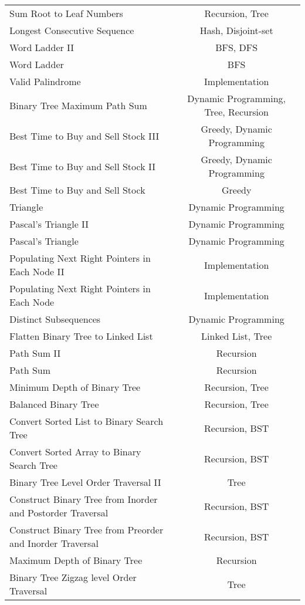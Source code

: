 \documentclass[paper=a4, fontsize=11pt]{scrartcl} %
\begin{document}
\begin{center}
\begin{longtable}{|l|c|}
    Sum Root to Leaf Numbers    &   Recursion, Tree   \\
    Longest Consecutive Sequence    &   Hash, Disjoint-set    \\
    Word Ladder II  &   BFS, DFS    \\
    Word Ladder &   BFS \\
    Valid Palindrome    &   Implementation  \\
    Binary Tree Maximum Path Sum    &   Dynamic Programming, Tree, Recursion \\
    Best Time to Buy and Sell Stock III &   Greedy, Dynamic Programming \\
    Best Time to Buy and Sell Stock II  &   Greedy, Dynamic Programming \\
    Best Time to Buy and Sell Stock &   Greedy  \\
    Triangle    &   Dynamic Programming    \\
    Pascal's Triangle II    &   Dynamic Programming \\
    Pascal's Triangle   &   Dynamic Programming \\
    Populating Next Right Pointers in Each Node II  &   Implementation  \\
    Populating Next Right Pointers in Each Node &   Implementation  \\
    Distinct Subsequences   &   Dynamic Programming \\
    Flatten Binary Tree to Linked List  &   Linked List, Tree\\
    Path Sum II &   Recursion   \\
    Path Sum    &   Recursion   \\
    Minimum Depth of Binary Tree    &   Recursion, Tree   \\
    Balanced Binary Tree    &   Recursion, Tree   \\
    Convert Sorted List to Binary Search Tree   &   Recursion, BST \\
    Convert Sorted Array to Binary Search Tree  &   Recursion, BST  \\
    Binary Tree Level Order Traversal II    &   Tree  \\
    Construct Binary Tree from Inorder and Postorder Traversal  &   Recursion, BST  \\
    Construct Binary Tree from Preorder and Inorder Traversal   &   Recursion, BST  \\
    Maximum Depth of Binary Tree    &   Recursion   \\
    Binary Tree Zigzag level Order Traversal    &   Tree  \\

\end{longtable}
\end{center}
\end{document}
